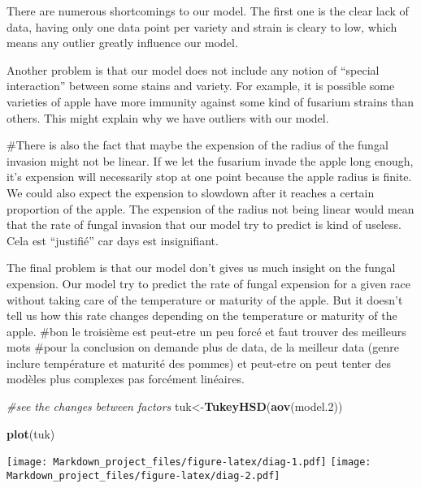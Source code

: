 \documentclass[
]{article}
\newenvironment{Shaded}{\begin{snugshade}}{\end{snugshade}}
\newcommand{\CommentTok}[1]{\textcolor[rgb]{0.56,0.35,0.01}{\textit{#1}}}
\newcommand{\FloatTok}[1]{\textcolor[rgb]{0.00,0.00,0.81}{#1}}
\newcommand{\KeywordTok}[1]{\textcolor[rgb]{0.13,0.29,0.53}{\textbf{#1}}}
\newcommand{\NormalTok}[1]{#1}
\begin{document}
There are numerous shortcomings to our model. The first one is the clear
lack of data, having only one data point per variety and strain is
cleary to low, which means any outlier greatly influence our model.

Another problem is that our model does not include any notion of
``special interaction'' between some stains and variety. For example, it
is possible some varieties of apple have more immunity against some kind
of fusarium strains than others. This might explain why we have outliers
with our model.

\#There is also the fact that maybe the expension of the radius of the
fungal invasion might not be linear. If we let the fusarium invade the
apple long enough, it's expension will necessarily stop at one point
because the apple radius is finite. We could also expect the expension
to slowdown after it reaches a certain proportion of the apple. The
expension of the radius not being linear would mean that the rate of
fungal invasion that our model try to predict is kind of useless. Cela
est ``justifié'' car days est insignifiant.

The final problem is that our model don't gives us much insight on the
fungal expension. Our model try to predict the rate of fungal expension
for a given race without taking care of the temperature or maturity of
the apple. But it doesn't tell us how this rate changes depending on the
temperature or maturity of the apple. \#bon le troisième est peut-etre
un peu forcé et faut trouver des meilleurs mots \#pour la conclusion on
demande plus de data, de la meilleur data (genre inclure température et
maturité des pommes) et peut-etre on peut tenter des modèles plus
complexes pas forcément linéaires.

\begin{Shaded}
\begin{Highlighting}[]
\CommentTok{#see the changes between factors}
\NormalTok{tuk<-}\KeywordTok{TukeyHSD}\NormalTok{(}\KeywordTok{aov}\NormalTok{(model}\FloatTok{.2}\NormalTok{))}
\end{Highlighting}
\end{Shaded}

\begin{Shaded}
\begin{Highlighting}[]
\KeywordTok{plot}\NormalTok{(tuk)}
\end{Highlighting}
\end{Shaded}

\texttt{[image: Markdown\_project\_files/figure-latex/diag-1.pdf]}
\texttt{[image: Markdown\_project\_files/figure-latex/diag-2.pdf]}
\end{document}
